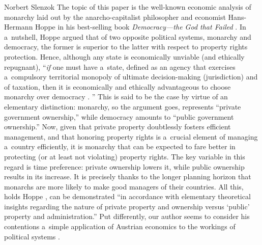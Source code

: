 \begin{artengenv}{Norbert Slenzok}
\lettrine[loversize=0.13,lines=2,lraise=-0.03,nindent=0em,findent=0.2pt]%
{T}{}he topic of this paper is the well-known economic analysis of monarchy laid out by the anarcho-capitalist philosopher and economist Hans-Hermann Hoppe in his best-selling book \textit{Democracy---the God that Failed} 
\parencite*[][]{hoppe_democracy_2007}. %
 In a~nutshell, Hoppe argued that of two opposite political systems, monarchy and democracy, the former is superior to the latter with respect to property rights protection. Hence, although any state is economically unviable (and ethically repugnant), ``\textit{if} one must have a~state, defined as an agency that exercises a~compulsory territorial monopoly of ultimate decision-making (jurisdiction) and of taxation, then it is economically and ethically advantageous to choose monarchy over democracy 
\parencite*[][p.xx]{hoppe_democracy_2007}.%
'' This is said to be the case by virtue of an elementary distinction: monarchy, so the argument goes, represents ``private government ownership,'' while democracy amounts to ``public government ownership.'' Now, given that private property doubtlessly fosters efficient management, and that honoring property rights is a~crucial element of managing a~country efficiently, it is monarchy that can be expected to fare better in protecting (or at least not violating) property rights. The key variable in this regard is time preference: private ownership lowers it, while public ownership results in its increase. It is precisely thanks to the longer planning horizon that monarchs are more likely to make good managers of their countries. All this, holds Hoppe 
\parencite*[][p.xix]{hoppe_democracy_2007}, %
 can be demonstrated ``in accordance with elementary theoretical insights regarding the nature of private property and ownership versus ‘public' property and administration.'' Put differently, our author seems to consider his contentions a~simple application of Austrian economics to the workings of political systems 
\parencite[][p.xxii]{hoppe_democracy_2007}.%





\end{artengenv}
